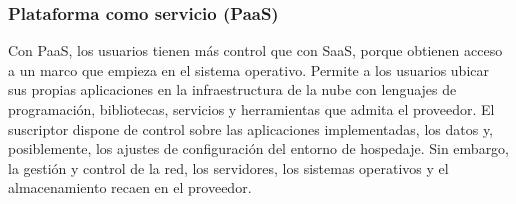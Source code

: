 \subsubsection{Plataforma como servicio (PaaS)}
Con PaaS, los usuarios tienen más control que con SaaS, porque obtienen acceso a un marco que empieza en el sistema operativo. Permite a los usuarios ubicar sus propias aplicaciones en la infraestructura de la nube con lenguajes de programación, bibliotecas, servicios y herramientas que admita el proveedor. El suscriptor dispone de control sobre las aplicaciones implementadas, los datos y, posiblemente, los ajustes de configuración del entorno de hospedaje. Sin embargo, la gestión y control de la red, los servidores, los sistemas operativos y el almacenamiento recaen en el proveedor.
